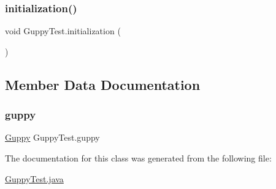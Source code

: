 \subsubsection{\texorpdfstring{initialization()}{initialization()}}
{\footnotesize\ttfamily void Guppy\+Test.\+initialization (\begin{DoxyParamCaption}{ }\end{DoxyParamCaption})\hspace{0.3cm}{\ttfamily [inline]}}



\subsection{Member Data Documentation}
\mbox{\label{class_guppy_test_ad7ca1cfd1192cfc0875773b82df60bfb}} 
\subsubsection{\texorpdfstring{guppy}{guppy}}
{\footnotesize\ttfamily \mbox{\hyperlink{class_guppy}{Guppy}} Guppy\+Test.\+guppy}



The documentation for this class was generated from the following file\+:\begin{DoxyCompactItemize}
\item 
\mbox{\hyperlink{_guppy_test_8java}{Guppy\+Test.\+java}}\end{DoxyCompactItemize}
